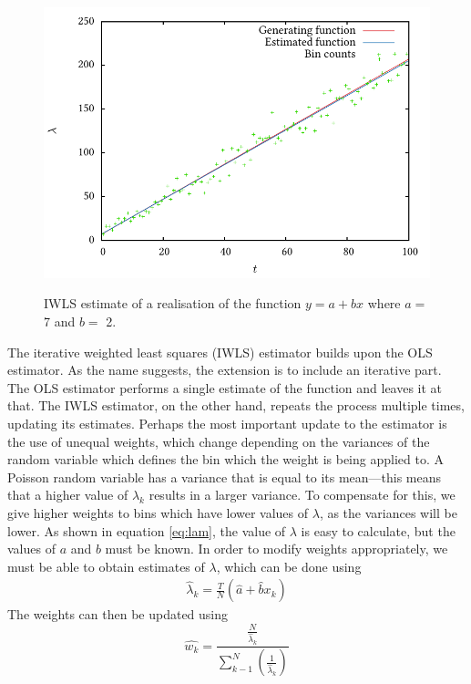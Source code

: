 \documentclass[a4paper,11pt]{article}
\begin{document}
    \begin{figure}
    \includegraphics{lineest}
    \label{fig:line}
    \caption{IWLS estimate of a realisation of the function $y=a+bx$ where $a=$ 7
    and $b=$ 2.}
    \end{figure}
    The iterative weighted least squares (IWLS) estimator builds upon the OLS
    estimator. As the name suggests, the extension is to include an iterative
    part. The OLS estimator performs a single estimate of the function and leaves it
    at that. The IWLS estimator, on the other hand, repeats the process multiple
    times, updating its estimates. Perhaps the most important update to the
    estimator is the use of unequal weights, which change depending on the variances
    of the random variable which defines the bin which the weight is being applied
    to. A Poisson random variable has a variance that is equal to its mean---this
    means that a higher value of ${\lambda}_k$ results in a larger variance. To
    compensate for this, we give higher weights to bins which have lower values of
    $\lambda$, as the variances will be lower. As shown in equation \eqref{eq:lam},
    the value of $\lambda$ is easy to calculate, but the values of $a$ and $b$ must
    be known. In order to modify weights appropriately, we must be able to obtain
    estimates of $\lambda$, which can be done using \cite{massey1996estimating}
    \begin{align}
    \hat{\lambda}_k=\frac{T}{N}(\hat{a}+\hat{b}x_k)
    \end{align}
    The weights can then be updated using
    \begin{equation}
    \hat{w_k}=\frac{\displaystyle \frac{N}{\hat{\lambda}_k}}{\displaystyle \sum_{k-1}^N\left(\frac{1}{\hat{\lambda}_k}\right)}
    \end{equation}
\end{document}
